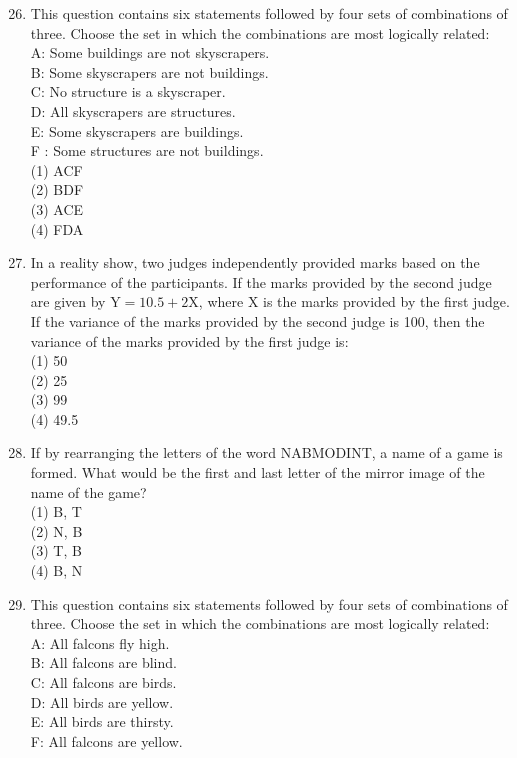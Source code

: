 \documentclass[10pt]{article}
\begin{document}
\begin{enumerate}
  \setcounter{enumi}{25}
  \item This question contains six statements followed by four sets of combinations of three. Choose the set in which the combinations are most logically related:\\
A: Some buildings are not skyscrapers.\\
B: Some skyscrapers are not buildings.\\
C: No structure is a skyscraper.\\
D: All skyscrapers are structures.\\
E: Some skyscrapers are buildings.\\
F : Some structures are not buildings.\\
(1) ACF\\
(2) BDF\\
(3) ACE\\
(4) FDA
  \item In a reality show, two judges independently provided marks based on the performance of the participants. If the marks provided by the second judge are given by $\mathrm{Y}=10.5+2 \mathrm{X}$, where X is the marks provided by the first judge. If the variance of the marks provided by the second judge is 100, then the variance of the marks provided by the first judge is:\\
(1) 50\\
(2) 25\\
(3) 99\\
(4) 49.5
  \item If by rearranging the letters of the word NABMODINT, a name of a game is formed. What would be the first and last letter of the mirror image of the name of the game?\\
(1) B, T\\
(2) N, B\\
(3) T, B\\
(4) B, N
  \item This question contains six statements followed by four sets of combinations of three. Choose the set in which the combinations are most logically related:\\
A: All falcons fly high.\\
B: All falcons are blind.\\
C: All falcons are birds.\\
D: All birds are yellow.\\
E: All birds are thirsty.\\
F: All falcons are yellow.\\

\end{enumerate}
\end{document}
